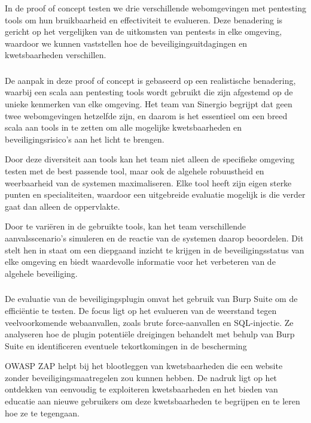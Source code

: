 In de proof of concept testen we drie verschillende webomgevingen met pentesting tools om hun bruikbaarheid en effectiviteit te evalueren. 
Deze benadering is gericht op het vergelijken van de uitkomsten van pentests in elke omgeving, waardoor we kunnen vaststellen hoe de 
beveiligingsuitdagingen en kwetsbaarheden verschillen.

\subsubsection{}
De aanpak in deze proof of concept is gebaseerd op een realistische benadering, waarbij een scala aan pentesting tools wordt gebruikt die zijn afgestemd 
op de unieke kenmerken van elke omgeving. Het team van Sinergio begrijpt dat geen twee webomgevingen hetzelfde zijn, en daarom is het essentieel om een breed scala 
aan tools in te zetten om alle mogelijke kwetsbaarheden en beveiligingsrisico's aan het licht te brengen.

Door deze diversiteit aan tools kan het team niet alleen de specifieke omgeving testen met de best passende tool, maar ook de algehele robuustheid en 
weerbaarheid van de systemen maximaliseren. Elke tool heeft zijn eigen sterke punten en specialiteiten, waardoor een uitgebreide evaluatie mogelijk 
is die verder gaat dan alleen de oppervlakte.

Door te variëren in de gebruikte tools, kan het team verschillende aanvalsscenario's simuleren en de reactie van de systemen daarop beoordelen. Dit 
stelt hen in staat om een diepgaand inzicht te krijgen in de beveiligingsstatus van elke omgeving en biedt waardevolle informatie voor het verbeteren 
van de algehele beveiliging.

\subsubsection{}
De evaluatie van de beveiligingsplugin omvat het gebruik van Burp Suite om de efficiëntie te testen. De focus ligt op het evalueren van de weerstand 
tegen veelvoorkomende webaanvallen, zoals brute force-aanvallen en SQL-injectie. Ze analyseren hoe de plugin potentiële dreigingen behandelt met 
behulp van Burp Suite en identificeren eventuele tekortkomingen in de bescherming

OWASP ZAP helpt bij het blootleggen van kwetsbaarheden die een website zonder beveiligingsmaatregelen zou kunnen hebben. De nadruk ligt op het 
ontdekken van eenvoudig te exploiteren kwetsbaarheden en het bieden van educatie aan nieuwe gebruikers om deze kwetsbaarheden te begrijpen en 
te leren hoe ze te tegengaan.

